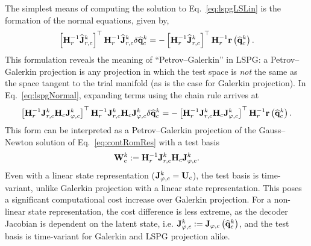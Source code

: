 The simplest means of computing the solution to Eq.~\ref{eq:lspgLSLin} is the formation of the normal equations, given by,
%
\begin{equation}\label{eq:lspgNormal}
    \left[\resScaleInv \jacobResCoefCons^{\newtonIdx}\right]^\top \resScaleInv \jacobResCoefCons^{\newtonIdx} \delta \consVecCoef^{\newtonIdx} = -\left[\resScaleInv \jacobResCoefCons^{\newtonIdx}\right]^\top \resScaleInv \resFunc{\consVecCoef^{\newtonIdx}}.
\end{equation}
%
This formulation reveals the meaning of ``Petrov--Galerkin'' in LSPG: a Petrov--Galerkin projection is any projection in which the test space is \textit{not} the same as the space tangent to the trial manifold (as is the case for Galerkin projection). In Eq.~\ref{eq:lspgNormal}, expanding terms using the chain rule arrives at
%
\begin{equation}
    \left[\resScaleInv \jacobResCons^{\newtonIdx} \consScale \jacobTrialCons^{\newtonIdx}\right]^\top \resScaleInv \jacobResCons^{\newtonIdx} \consScale \jacobTrialCons^{\newtonIdx} \delta \consVecCoef^{\newtonIdx} = -\left[\resScaleInv \jacobResCons^{\newtonIdx} \consScale \jacobTrialCons^{\newtonIdx}\right]^\top \resScaleInv \resFunc{\consVecCoef^{\newtonIdx}}.
\end{equation}
%
This form can be interpreted as a Petrov--Galerkin projection of the Gauss--Newton solution of Eq.~\ref{eq:contRomRes} with a test basis
%
\begin{equation}
    \testBasisCons^\newtonIdx \defEq \resScaleInv \jacobResCons^\newtonIdx \consScale \jacobTrialCons^{\newtonIdx}.
\end{equation}
%
Even with a linear state representation ($\jacobTrialCons^{\newtonIdx} = \consTrial$), the test basis is time-variant, unlike Galerkin projection with a linear state representation. This poses a significant computational cost increase over Galerkin projection. For a non-linear state representation, the cost difference is less extreme, as the decoder Jacobian is dependent on the latent state, i.e. $\mathbf{J}_{\varphi,c}^{k} := \mathbf{J}_{\varphi,c} \left(\mathbf{\widehat{q}}_{c}^{k}\right)$, and the test basis is time-variant for Galerkin and LSPG projection alike.

